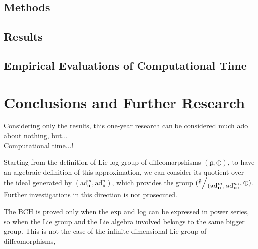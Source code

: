 \subsection{Methods}

\subsection{Results}


\subsection{Empirical Evaluations of Computational Time}


\section{Conclusions and Further Research}\label{ch:conclusions}


Considering only the results, this one-year research can be considered much ado about nothing, but...\\
Computational time...!

Starting from the definition of Lie log-group of diffeomorpshisms $(\mathfrak{g} , \oplus)$, to have an algebraic definition of this approximation, we can consider its quotient over the ideal generated by $(\text{ad}_{\mathbf{u}}^{m}, \text{ad}_{\mathbf{u}}^{n})$, which provides the group $(\quotient{\mathfrak{g}}{(\text{ad}_{\mathbf{u}}^{m}, \text{ad}_{\mathbf{u}}^{n})}, \oplus)$. Further investigations in this direction is not prosecuted.


The BCH is proved only when the exp and log can be expressed in power series, so when the Lie group and the Lie algebra involved belongs to the same bigger group. This is not the case of the infinite dimensional Lie group of diffeomorphisms,